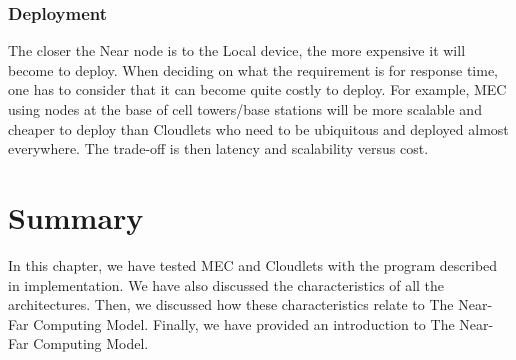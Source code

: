 \subsubsection{Deployment}
The closer the Near node is to the Local device, the more expensive it will become to deploy. When deciding on what the requirement is for response time, one has to consider that it can become quite costly to deploy. For example, MEC using nodes at the base of cell towers/base stations will be more scalable and cheaper to deploy than Cloudlets who need to be ubiquitous and deployed almost everywhere. The trade-off is then latency and scalability versus cost. 


\section{Summary}
In this chapter, we have tested MEC and Cloudlets with the program described in implementation. We have also discussed the characteristics of all the architectures. Then, we discussed how these characteristics relate to The Near-Far Computing Model. Finally, we have provided an introduction to The Near-Far Computing Model.






